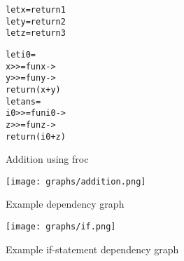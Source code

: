 \begin{figure}
  \begin{alltt}
let x = return 1
let y = return 2
let z = return 3

let i0 =
    x >>= fun x ->
        y >>= fun y ->
            return (x + y)
let ans =
    i0 >>= fun i0 ->
        z >>= fun z ->
            return (i0 + z)
  \end{alltt}
  \caption{Addition using froc}
  \label{add_code}
\end{figure}

\begin{figure}
  \centering
  \texttt{[image: graphs/addition.png]}
  \caption{Example dependency graph}
  \label{add_graph}
\end{figure}

\begin{figure}
  \centering
  \texttt{[image: graphs/if.png]}
  \caption{Example if-statement dependency graph}
  \label{if_graph}
\end{figure}

